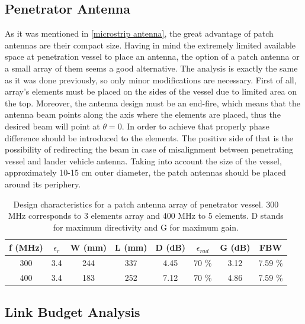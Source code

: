 \subsection{Penetrator Antenna}

As it was mentioned in \ref{microstrip antenna}, the great advantage of patch antennas are their compact size. Having in mind the extremely limited available space at penetration vessel to place an antenna, the option of a patch antenna or a small array of them seems a good alternative. The analysis is exactly the same as it was done previously, so only minor modifications are necessary. First of all, array's elements must be placed on the sides of the vessel due to limited area on the top. Moreover, the antenna design must be an end-fire, which means that the antenna beam points along the axis where the elements are placed, thus the desired beam will point at $\theta=0$. In order to achieve that properly phase difference should be introduced to the elements. The positive side of that is the possibility of redirecting the beam in case of misalignment between penetrating vessel and lander vehicle antenna. Taking into account the size of the vessel, approximately 10-15 cm outer diameter, the patch antennas should be placed around its periphery. 

\begin{table}[ht]
\centering
\begin{tabular}{| c | c | c | c | c | c | c | c |}
\hline
 \textbf{f (MHz)} & \textbf{$\epsilon_{r}$} & \textbf{W (mm)} & \textbf{L (mm)} & \textbf{D (dB)} & \textbf{$\epsilon_{rad}$} & \textbf{G (dB)} & FBW \\ 
 \hline
 300 & 3.4 & 244 & 337 & 4.45 & 70 \% & 3.12 & 7.59 \% \\
 \hline
 400 & 3.4 & 183 & 252 & 7.12 & 70 \% & 4.86 & 7.59 \% \\
 \hline
\end{tabular}
\caption{Design characteristics for a patch antenna array of penetrator vessel. 300 MHz corresponds to 3 elements array and 400 MHz to 5 elements. D stands for maximum directivity and G for maximum gain.}
\label{table: results_pen}
\end{table}

\subsection{Link Budget Analysis}

